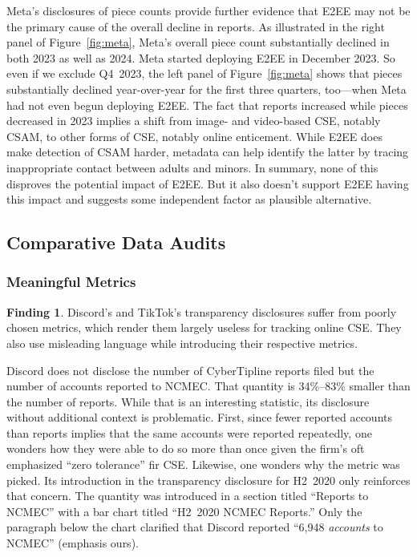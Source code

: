 \documentclass[anonymous,nonacm,screen,12pt]{acmart}
\newcommand\V[1]{{#1}}
\newcommand\V[1]{\textsc{\MakeLowercase{#1}}}
\theoremstyle{definition}
\newtheorem{finding}{Finding}
\begin{document}
Meta's disclosures of piece counts provide further evidence that \V{E2EE} may
not be the primary cause of the overall decline in reports. As illustrated in
the right panel of Figure~\ref{fig:meta}, Meta's overall piece count
substantially declined in both 2023 as well as 2024. Meta started deploying
\V{E2EE} in December 2023. So even if we exclude \V{Q4}~2023, the left panel of
Figure~\ref{fig:meta} shows that pieces substantially declined year-over-year
for the first three quarters, too---when Meta had not even begun deploying
\V{E2EE}. The fact that reports increased while pieces decreased in 2023 implies
a shift from image- and video-based \V{CSE}, notably \V{CSAM}, to other forms of
\V{CSE}, notably online enticement. While \V{E2EE} does make detection of
\V{CSAM} harder, metadata can help identify the latter by tracing inappropriate
contact between adults and minors. In summary, none of this disproves the
potential impact of \V{E2EE}. But it also doesn't support \V{E2EE} having this
impact and suggests some independent factor as plausible alternative.



\subsection{Comparative Data Audits}
\label{sec:findings:audits}

\subsubsection{Meaningful Metrics}

\begin{finding}
Discord's and TikTok's transparency disclosures suffer from poorly chosen
metrics, which render them largely useless for tracking online \V{CSE}. They
also use misleading language while introducing their respective metrics.
\end{finding}

\noindent{}Discord does not disclose the number of CyberTipline reports filed
but the number of accounts reported to \V{NCMEC}. That quantity is 34\%--83\%
smaller than the number of reports. While that is an interesting statistic, its
disclosure without additional context is problematic. First, since fewer
reported accounts than reports implies that the same accounts were reported
repeatedly, one wonders how they were able to do so more than once given the
firm's oft emphasized ``zero tolerance'' fir \V{CSE}. Likewise, one wonders why
the metric was picked. Its introduction in the transparency disclosure for
\V{H2}~2020 only reinforces that concern. The quantity was introduced in a
section titled ``Reports to \V{NCMEC}'' with a bar chart titled ``\V{H2}~2020
\V{NCMEC} Reports.'' Only the paragraph below the chart clarified that Discord
reported ``6,948 \emph{accounts} to \V{NCMEC}'' (emphasis ours).
\end{document}
